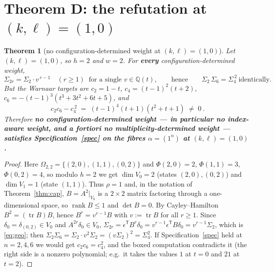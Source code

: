 \documentclass[11pt]{article}
\theoremstyle{plain}
\newtheorem{theorem}{Theorem}
\theoremstyle{definition}
\theoremstyle{remark}
\newcommand{\tr}{\operatorname{tr}}
\begin{document}
\section{Theorem D: the refutation at $(k,\ell)=(1,0)$}

\begin{theorem}[no configuration-determined weight at $(k,\ell)=(1,0)$]\label{thm:kill}
Let $(k,\ell)=(1,0)$, so $h=2$ and $w=2$. For \textbf{every} configuration-determined weight,
\begin{equation}\label{eq:geo}
\Sigma_{2r}=\Sigma_2\cdot v^{\,r-1}\quad(r\ge1)\ \text{ for a single }v\in\mathbb{Q}(t),
\qquad\text{hence}\qquad \Sigma_2\,\Sigma_6=\Sigma_4^{\,2}\ \text{identically.}
\end{equation}
But the Warnaar targets are $c_2=1-t$, $c_4=(t-1)^2(t+2)$,
$c_6=-(t-1)^3(t^3+3t^2+6t+5)$, and
\[
\boxed{\ c_2c_6-c_4^{\,2}\;=\;(t-1)^4(t+1)(t^2+t+1)\;\neq\;0\ .}
\]
Therefore \textbf{no configuration-determined weight --- in particular no index-aware weight,
and a fortiori no multiplicity-determined weight --- satisfies Specification~\ref{spec} on the
fibres $\alpha=(1^n)$ at $(k,\ell)=(1,0)$.}
\end{theorem}

\begin{proof}
Here $\Omega_{2,2}=\{(2,0),(1,1),(0,2)\}$ and $\Phi(2,0)=2$, $\Phi(1,1)=3$, $\Phi(0,2)=4$, so
modulo $h=2$ we get $\dim V_0=2$ (states $(2,0),(0,2)$) and $\dim V_1=1$ (state $(1,1)$). Thus
$\rho=1$ and, in the notation of Theorem~\ref{thm:cap}, $B=A^2|_{V_0}$ is a $2\times2$ matrix
factoring through a one-dimensional space, so $\operatorname{rank}B\le1$ and $\det B=0$. By
Cayley--Hamilton $B^2=(\tr B)B$, hence $B^r=v^{r-1}B$ with $v:=\tr B$ for all $r\ge1$. Since
$\delta_0=\delta_{(0,2)}\in V_0$ and $A^{2r}\delta_0\in V_0$,
$\Sigma_{2r}=\epsilon^{\mathsf T}B^{r}\delta_0=v^{r-1}\epsilon^{\mathsf T}B\delta_0=v^{r-1}\Sigma_2$,
which is \eqref{eq:geo}; then $\Sigma_2\Sigma_6=\Sigma_2\cdot v^2\Sigma_2=(v\Sigma_2)^2=\Sigma_4^2$.
If Specification~\ref{spec} held at $n=2,4,6$ we would get $c_2c_6=c_4^2$, and the boxed
computation contradicts it (the right side is a nonzero polynomial; e.g.\ it takes the values
$1$ at $t=0$ and $21$ at $t=2$).
\end{proof}
\end{document}

